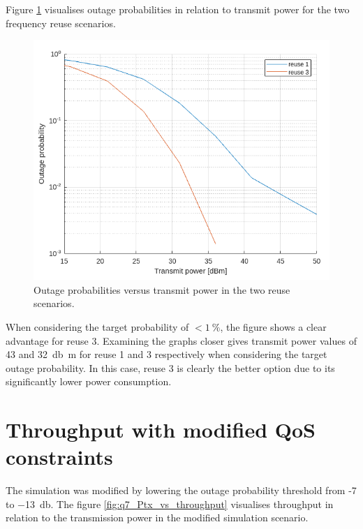 \documentclass{article}
\begin{document}
Figure \ref{fig:q6_Ptx_vs_outage} visualises outage probabilities in relation to transmit power for the two frequency reuse scenarios.

\begin{figure}[!htb]
    \centering
    \includegraphics[width=12cm]{images/q6_Ptx_vs_outage.png}
    \caption{Outage probabilities versus transmit power in the two reuse scenarios.}
    \label{fig:q6_Ptx_vs_outage}
\end{figure}

When considering the target probability of \(< 1\ \%\), the figure shows a clear advantage for reuse 3. Examining the graphs closer gives transmit power values of 43 and \SI{32}{\decibel m} for reuse 1 and 3 respectively when considering the target outage probability. In this case, reuse 3 is clearly the better option due to its significantly lower power consumption.

\section{Throughput with modified QoS constraints}

The simulation was modified by lowering the outage probability threshold from -7 to \SI{-13}{\decibel}. The figure \ref{fig:q7_Ptx_vs_throughput} visualises throughput in relation to the transmission power in the modified simulation scenario.
\end{document}
